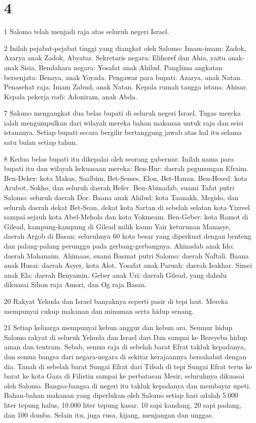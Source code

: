 \chapter{4}

\par 1 Salomo telah menjadi raja atas seluruh negeri Israel.
\par 2 Inilah pejabat-pejabat tinggi yang diangkat oleh Salomo: Imam-imam: Zadok, Azarya anak Zadok, Abyatar. Sekretaris negara: Elihoref dan Ahia, yaitu anak-anak Sisia. Bendahara negara: Yosafat anak Ahilud. Panglima angkatan bersenjata: Benaya, anak Yoyada. Pengawas para bupati: Azarya, anak Natan. Penasehat raja: Imam Zabud, anak Natan. Kepala rumah tangga istana: Ahisar. Kepala pekerja rodi: Adoniram, anak Abda.
\par 7 Salomo mengangkat dua belas bupati di seluruh negeri Israel. Tugas mereka ialah mengumpulkan dari wilayah mereka bahan makanan untuk raja dan seisi istananya. Setiap bupati secara bergilir bertanggung jawab atas hal itu selama satu bulan setiap tahun.
\par 8 Kedua belas bupati itu dikepalai oleh seorang gubernur. Inilah nama para bupati itu dan wilayah kekuasaan mereka: Ben-Hur: daerah pegunungan Efraim. Ben-Deker: kota Makas, Saalbim, Bet-Semes, Elon, Bet-Hanan. Ben-Hesed: kota Arubot, Sokho, dan seluruh daerah Hefer. Ben-Abinadab, suami Tafat putri Salomo: seluruh daerah Dor. Baana anak Ahilud: kota Taanakh, Megido, dan seluruh daerah dekat Bet-Sean, dekat kota Sartan di sebelah selatan kota Yizreel sampai sejauh kota Abel-Mehola dan kota Yokmeam. Ben-Geber: kota Ramot di Gilead, kampung-kampung di Gilead milik kaum Yair keturunan Manasye, daerah Argob di Basan; seluruhnya 60 kota besar yang diperkuat dengan benteng dan palang-palang perunggu pada gerbang-gerbangnya. Ahinadab anak Ido: daerah Mahanaim. Ahimaas, suami Basmat putri Salomo: daerah Naftali. Baana anak Husai: daerah Asyer, kota Alot. Yosafat anak Paruah: daerah Isakhar. Simei anak Ela: daerah Benyamin. Geber anak Uri: daerah Gilead, yang dahulu dikuasai Sihon raja Amori, dan Og raja Basan.
\par 20 Rakyat Yehuda dan Israel banyaknya seperti pasir di tepi laut. Mereka mempunyai cukup makanan dan minuman serta hidup senang.
\par 21 Setiap keluarga mempunyai kebun anggur dan kebun ara. Seumur hidup Salomo rakyat di seluruh Yehuda dan Israel dari Dan sampai ke Bersyeba hidup aman dan tentram. Sebab, semua raja di sebelah barat Efrat takluk kepadanya, dan semua bangsa dari negara-negara di sekitar kerajaannya bersahabat dengan dia. Tanah di sebelah barat Sungai Efrat dari Tifsah di tepi Sungai Efrat terus ke barat ke kota Gaza di Filistin sampai ke perbatasan Mesir, seluruhnya dikuasai oleh Salomo. Bangsa-bangsa di negeri itu takluk kepadanya dan membayar upeti. Bahan-bahan makanan yang diperlukan oleh Salomo setiap hari adalah 5.000 liter tepung halus, 10.000 liter tepung kasar, 10 sapi kandang, 20 sapi padang, dan 100 domba. Selain itu, juga rusa, kijang, menjangan dan unggas.
